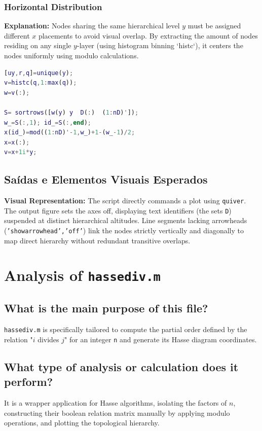 \subsection{Horizontal Distribution}
\textbf{Explanation:} 
Nodes sharing the same hierarchical level $y$ must be assigned different $x$ placements to avoid visual overlap. By extracting the amount of nodes residing on any single $y$-layer (using histogram binning `histc`), it centers the nodes uniformly using modulo calculations.

\begin{lstlisting}[language=Matlab]
[uy,r,q]=unique(y);
v=histc(q,1:max(q));
w=v(:); 

S= sortrows([w(y) y  D(:)  (1:nD)']);
w_=S(:,1); id_=S(:,end);
x(id_)=mod((1:nD)'-1,w_)+1-(w_-1)/2;
x=x(:);
v=x+1i*y;
\end{lstlisting}

\section{Saídas e Elementos Visuais Esperados}
\textbf{Visual Representation:} The script directly commands a plot using \texttt{quiver}. The output figure sets the axes off, displaying text identifiers (the sets \texttt{D}) suspended at distinct hierarchical altitudes. Line segments lacking arrowheads (\texttt{'showarrowhead','off'}) link the nodes strictly vertically and diagonally to map direct hierarchy without redundant transitive overlaps.


\newpage
\chapter{Analysis of \texttt{hassediv.m}}

\section{What is the main purpose of this file?}
\texttt{hassediv.m} is specifically tailored to compute the partial order defined by the relation "$i$ divides $j$" for an integer \texttt{n} and generate its Hasse diagram coordinates.

\section{What type of analysis or calculation does it perform?}
It is a wrapper application for Hasse algorithms, isolating the factors of $n$, constructing their boolean relation matrix manually by applying modulo operations, and plotting the topological hierarchy.

